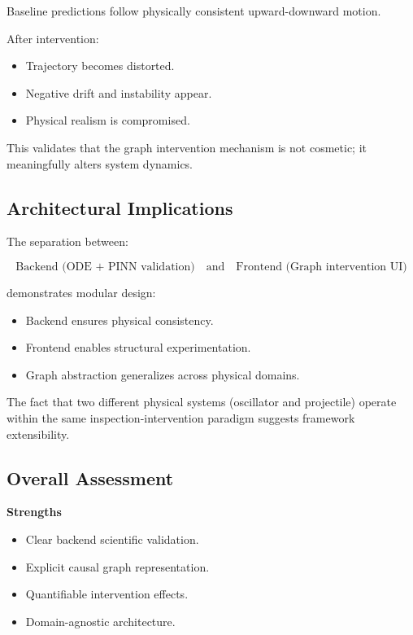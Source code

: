 \documentclass[12pt,singleside,a4paper]{article}
\begin{document}
Baseline predictions follow physically consistent upward-downward motion.

After intervention:
\begin{itemize}
    \item Trajectory becomes distorted.
    \item Negative drift and instability appear.
    \item Physical realism is compromised.
\end{itemize}

This validates that the graph intervention mechanism is not cosmetic; it meaningfully alters system dynamics.

\subsection{Architectural Implications}

The separation between:

\[
\text{Backend (ODE + PINN validation)} 
\quad \text{and} \quad
\text{Frontend (Graph intervention UI)}
\]

demonstrates modular design:

\begin{itemize}
    \item Backend ensures physical consistency.
    \item Frontend enables structural experimentation.
    \item Graph abstraction generalizes across physical domains.
\end{itemize}

The fact that two different physical systems (oscillator and projectile) operate within the same inspection-intervention paradigm suggests framework extensibility.

\subsection{Overall Assessment}

\textbf{Strengths}
\begin{itemize}
    \item Clear backend scientific validation.
    \item Explicit causal graph representation.
    \item Quantifiable intervention effects.
    \item Domain-agnostic architecture.
\end{itemize}
\end{document}
